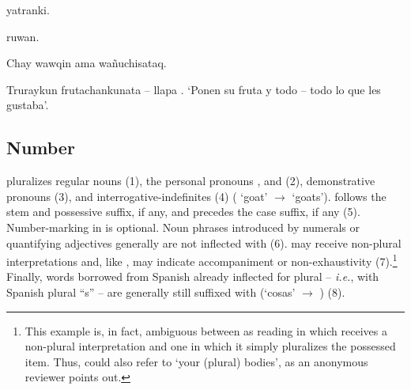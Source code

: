 {%
{ yatranki.}%
{}%
{}{}%

%
{ ruwan.}%
{}%
{}{}%

%
{Chay wawqin ama  wa\~nuchisataq.}%
{}%
{}{}%

%
{Truraykun frutachankunata -- llapa .}%
{}%
%
{`Ponen su fruta y todo -- todo lo que les gustaba'.}%
{}{}%

\subsection{Number }
 pluralizes regular nouns (1), the personal pronouns ,  and  (2), demonstrative pronouns (3), and interrogative-indefinites (4) ( `goat' $\rightarrow$  `goats').  follows the stem and possessive suffix, if any, and precedes the case suffix, if any (5). Number-marking in \SYQ{} is optional. Noun phrases introduced by numerals or quantifying adjectives generally are not inflected with  (6).  may receive non-plural interpretations and, like , may indicate accompaniment or non-exhaustivity (7).\footnote{This example is, in fact, ambiguous between as reading in which  receives a non-plural interpretation and one in which it simply pluralizes the possessed item. Thus,  could also refer to `your (plural) bodies', as an anonymous reviewer points out.} Finally, words borrowed from Spanish already inflected for plural -- \emph{i.e.}, with Spanish plural ``s'' -- are generally still suffixed with  (`cosas' $\rightarrow$ ) (8).

}
